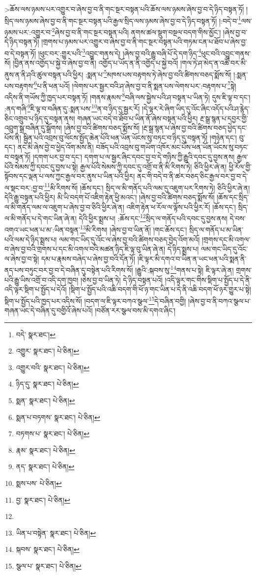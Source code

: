  >ཆོས་ལས་ཉམས་པར་འགྱུར་བ་ཞེས་བྱ་བ་ནི་གང་སྔར་བསྟན་པའི་ཆོས་ལས་ཉམས་ཞེས་བྱ་བ་དེ་ཉིད་བསྟན་ཏོ། །སྲིད་ལས་ཉམས་ཞེས་བྱ་བ་ནི་གང་སྔར་བསྟན་པའི་རྒྱལ་སྲིད་ལས་ཉམས་ཞེས་བྱ་བ་དེ་ཉིད་བསྟན་ཏོ། །:བདེ་བ་\footnote{བདེ་  སྣར་ཐང་། }ལས་ཉམས་པར་:འགྱུར་བ་\footnote{འགྱུར་  སྣར་ཐང་།  པེ་ཅིན། }ཞེས་བྱ་བ་ནི་གང་སྔར་བསྟན་པའི། ནགས་ཚལ་སྡུག་བསྔལ་བདག་གིས་མྱོང་། །ཞེས་བྱ་བ་དེ་ཉིད་བསྟན་ཏོ། །གྲགས་པ་ཉམས་པར་འགྱུར་བ་ཞེས་བྱ་བ་ནི་གང་སྔར་བསྟན་པའི་གཏམ་ངན་པ་ཐོབ་པ་ཞེས་བྱ་བ་དེ་བསྟན་ཏོ། །ཕུང་བར་:གྱུར་པའི་\footnote{འགྱུར་བའི་  སྣར་ཐང་།  པེ་ཅིན། }འབྱུང་གནས་དེ། །ཞེས་བྱ་བའི་རྒྱུ་བཞི་པོ་དེ་དག་ཉིད་\footnote{ཉིད་དུ་  སྣར་ཐང་།  པེ་ཅིན། }ཕུང་བའི་འབྱུང་གནས་སོ། །བྱིན་ནས་འགྱོད་པ་སྐྱེ་བ་ཞེས་བྱ་བ་ནི། འགྱོད་པ་ཡོད་ན་ནི་འགྱོད་པ་སྐྱེ་བའོ། །གལ་ཏེ་ཤ་མེད་ན་འཚོ་བར་མི་ནུས་ན་ནི་ཤའི་ཚུལ་བསྟན་པའི་ཕྱིར། :སྨན་པ་\footnote{སྨན་  སྣར་ཐང་།  པེ་ཅིན། }མཁས་པས་བརྟགས་ཏེ་ཞེས་བྱ་བའི་ཚིགས་བཅད་སྨོས་སོ། །:སྨན་པས་བརྟགས་\footnote{སྨན་པ་བཏགས་  སྣར་ཐང་།  པེ་ཅིན། }པ་ནི་ཕན་པའོ། །ལེགས་པར་སྦྱར་བའི་ཤ་ཞེས་བྱ་བ་ནི་སྨན་པས་ལེགས་པར་:བརྟགས་པ་\footnote{བཏགས་པ་  སྣར་ཐང་།  པེ་ཅིན། }སྟེ། འདིས་ནི་གཡོས་ཀྱི་ཁྱད་པར་བསྟན་ཏོ། །གནས་རྣམས་\footnote{རྣམ་  སྣར་ཐང་།  པེ་ཅིན། }བཞི་ལས་སྐྱེས་པའི་ཤ་བསྟན་པ་ཡིན་ཏེ། དུས་ཇི་ལྟ་བ་དང་། :ནད་གཞི་\footnote{ནད་  སྣར་ཐང་།  པེ་ཅིན། }ཇི་ལྟ་བ་བཞིན་དུ་:སྨན་པས་\footnote{སྨས་པས་  པེ་ཅིན། }ན་བ་ཉིད་དུ་སྦྱར་རོ། །དེ་ལྟར་རེ་ཞིག་ཡིད་དུ་འོང་ཞིང་འདོད་པའི་ཤ་རྙེད་ཅིང་འགྲུབ་པ་ཉིད་དུ་བསྟན་ནས། གཞན་ཡང་བདེ་བ་ཐོབ་པ་ཡིན་ནོ་ཞེས་བསྟན་པའི་ཕྱིར། རྔ་སྒྲ་སྙན་པ་དབྱར་གྱི་འབྲུག་སྒྲ་བཞིན་དུ་སྒྲོགས། །ཞེས་བྱ་བའི་ཚིགས་བཅད་སྨོས་སོ། །རྔ་སྒྲ་སྙན་པ་ཞེས་བྱ་བའི་ཚིགས་བཅད་ཕྱེད་དང་པོས་ནི། སྦྱིན་པའི་འབྲས་བུ་ལོངས་སྤྱོད་ཆེན་པོའི་ཕན་ཡོན་ཡོངས་སུ་བཏང་བ་ཉིད་དུ་བསྟན་ཏོ། །གཉེན་དང་། བུ་དང་། ནང་མི་ཞེས་བྱེ་བ་ཕྱེད་འོག་མས་ནི། བཟོད་པའི་འབྲས་བུ་གཡོག་འཁོར་མང་པོས་ཕན་ཡོན་ཡོངས་སུ་བཏང་བ་བསྟན་ཏོ། །དགག་པར་བྱ་བ་དང་། དགག་པ་ལ་སྦྱར་ཞིང་དབང་བྱ་བ་དེ་གཉིས་ཀྱི་རྒྱུའི་དབང་དུ་བྱས་ནས། རྒྱལ་པོའི་སེམས་ཀྱི་དབང་དུ་བྱས་པ་སྟེ། རྒྱལ་པོའི་སེམས་ཀྱི་དབང་དུ་འགྲོ་བ་ནི་མི་རིགས་ཏེ། ཅིའི་ཕྱིར་ཞེ་ན། ཕྱི་རོལ་གྱི་སྟོབས་དང་ལྡན་པ་ལས་ཀྱང་རྒྱལ་བར་ནུས་པ་ཡིན་པའི་ཕྱིར། ནང་གི་བདེ་བ་ནི་ཚར་བཅད་ཅིང་རྒྱལ་བར་བྱ་བ་དེ་ལ་སྡང་བར་:བྱ་བ་\footnote{བྱ་  སྣར་ཐང་།  པེ་ཅིན། }མི་རིགས་སོ། །ཆོས་དང་། སྲིད་ལ་མི་གནོད་པའི་ལམ་དུ་འཇུག་པར་རིགས་ཏེ། ཅིའི་ཕྱིར་ཞེ་ན། དེའི་རྒྱུ་བསྟན་པའི་ཕྱིར། མི་ཡི་བདག་པོ་འཇིག་རྟེན་ཕྱི་མའང་། །ཞེས་བྱ་བའི་ཚིགས་བཅད་སྨོས་སོ། །ཆོས་དང་སྲིད་ལ་མི་གནོད་ལམ་ལ་འཇུག་པ་ཞེས་བྱ་བ་ཅིའི་ཕྱིར་ཞེ་ན། འཇིག་རྟེན་ཕ་རོལ་ལ་ལྟོས་པའི་ཕྱིར་རོ། །ཆོས་དང་། སྲིད་ལ་མི་གནོད་པ་དེ་གང་ཡིན་ཞེ་ན། དེའི་ཕྱིར་སྨྲས་པ། :ཆོས་དང་\footnote{}སྲིད་ལ་གནོད་པའི་དབང་དུ་བྱས་ནས། དེ་བས་འགའ་ཡང་ཕན་པ་མ་:ཡིན་བསྟན་\footnote{ཡིན་པ་བསྟེན་  སྣར་ཐང་།  པེ་ཅིན། }མི་རིགས། །ཞེས་བྱ་བ་ཡིན་ནོ། །གང་ཆོས་དང་། སྲིད་ལ་གནོད་པ་མ་ཡིན་པའི་ལམ་དེ་ཉིད་སྨྲས་པ། ལམ་གང་ཡིད་དུ་འོང་ལ་ཞེས་བྱ་བའི་ཚིགས་བཅད་བྱེད་འོག་མའོ། །གྲགས་དང་མི་འགལ་བ་ཞེས་བྱ་བའི་གྲགས་པ་དང་མི་འགལ་བའི་མཚན་ཉིད་ཇི་ལྟ་བུ་ཡིན་ཞེ་ན། དེ་ཉིད་སྨྲས་པ། ལམ་གང་ཡིད་དུ་འོང་ལ་ཞེས་བྱ་བ་སྟེ། དམ་པ་རྣམས་བཞེད་པ་ཞེས་བྱ་བའི་དོན་ཏོ། །ཇི་ལྟར་མི་དགའ་བ་ཡིན་ན་ཡང་ཕན་པའི་སྨན་ནི་ནད་པས་བཏུང་བར་བྱ་བ་དེ་བཞིན་དུ་བསྟེན་པའི་རིགས་སོ། །རྒྱུའི་:སྐབས་སུ་\footnote{སྐབས་  སྣར་ཐང་།  པེ་ཅིན། }གནས་པ་སྟེ། ཇི་ལྟར་ཞེ་ན། གྲགས་པའི་རྒྱུ་ཡིས་འགྲོ་བ་འདི་དག་ཁྱབ། །ཅེས་བྱ་བ་ཡིན་ཏེ། དེ་ཉིད་བསྟན་པའོ། །འདི་ལྟར་གང་གིས་སྡིག་པ་སྤྱོད་པ་དེ་ནི་འདི་ལྟར་སྡིག་པ་སྤྱོད་པ་དེའོ། །སྡིག་པ་སྤྱོད་པའི་འཆི་བདག་གི་ཕོ་ཉ་གང་ཡིན་པ་དེ་ནི་འཆི་བདག་ཕོ་ཉར་གྱུར་པ་སྟེ། སྡིག་པ་སྤྱོད་པའི་ཁྱད་པར་འདིས་སོ། །བདག་ལ་ཇི་ལྟར་བཀའ་སྩལ་\footnote{སྩལ་པ་  སྣར་ཐང་།  པེ་ཅིན། }དེ་བཞིན་བགྱི། །ཞེས་བྱ་བ་ནི་བཀའ་སྩལ་པ་གཞན་ཡང་དེ་བཞིན་དུ་བགྱིའོ་ཞེས་པའོ། །བཙོན་རར་སྩལ་བས་མི་དགའ་ཞིང་། 